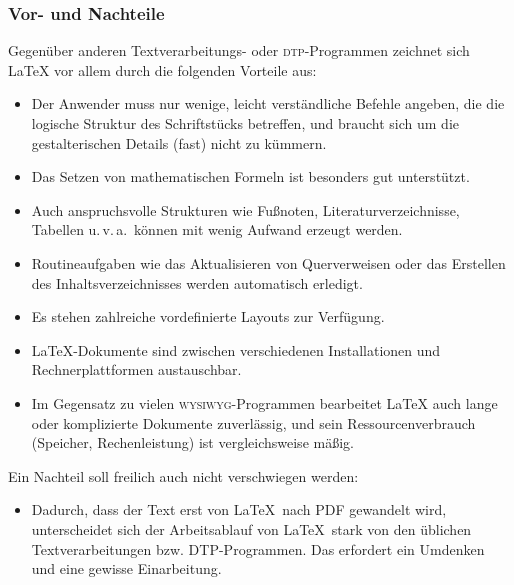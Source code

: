 \subsubsection{Vor- und Nachteile}

Gegenüber anderen Textverarbeitungs- oder \textsc{dtp}-Programmen 
zeichnet sich \LaTeX{}
vor allem durch die folgenden Vorteile aus:
\begin{itemize}
\item Der Anwender muss nur wenige, leicht verständliche Befehle
  angeben, die die logische Struktur des Schriftstücks
  betreffen, und braucht sich um die gestalterischen Details
  (fast) nicht zu kümmern.
\item Das Setzen von mathematischen Formeln ist besonders gut
  unterstützt.
\item Auch anspruchsvolle Strukturen wie Fußnoten, Literaturverzeichnisse,
  Tabellen u.\,v.\,a.\  können mit wenig Aufwand erzeugt werden.
\item Routineaufgaben wie das Aktualisieren von Querverweisen
 oder das Erstellen des Inhaltsverzeichnisses 
 werden automatisch erledigt.
\item Es stehen zahlreiche vordefinierte Layouts zur Verfügung.
\item \LaTeX-Dokumente sind zwischen verschiedenen Installationen und
 Rechnerplattformen austauschbar.
\item Im Gegensatz zu vielen \textsc{wysiwyg}-Programmen bearbeitet \LaTeX{} auch
  lange oder komplizierte Dokumente zuverlässig,
  und sein Ressourcenverbrauch (Speicher, Rechenleistung) ist vergleichsweise
  mäßig.
\end{itemize}
Ein Nachteil soll freilich auch nicht verschwiegen werden:
\begin{itemize}
\item Dadurch, dass der Text erst von \LaTeX\ nach PDF gewandelt wird, unterscheidet sich der Arbeitsablauf von \LaTeX\ stark von den üblichen Textverarbeitungen bzw. DTP-Programmen. Das erfordert ein Umdenken und eine gewisse Einarbeitung.
\end{itemize}

